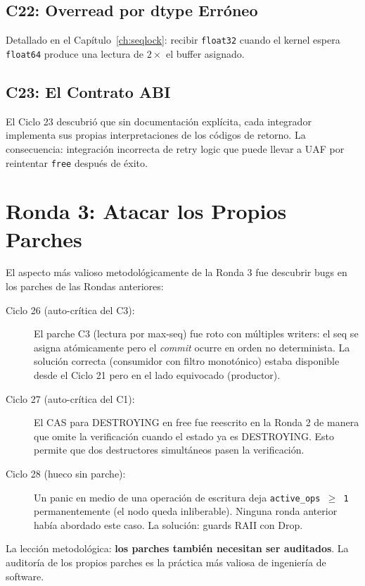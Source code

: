 \subsection{C22: Overread por dtype Erróneo}

Detallado en el Capítulo~\ref{ch:seqlock}: recibir \texttt{float32} cuando el
kernel espera \texttt{float64} produce una lectura de $2\times$ el buffer asignado.

\subsection{C23: El Contrato ABI}

El Ciclo 23 descubrió que sin documentación explícita, cada integrador implementa
sus propias interpretaciones de los códigos de retorno. La consecuencia: integración
incorrecta de retry logic que puede llevar a UAF por reintentar \texttt{free} después de éxito.

\section{Ronda 3: Atacar los Propios Parches}

El aspecto más valioso metodológicamente de la Ronda 3 fue descubrir bugs en los
parches de las Rondas anteriores:

\begin{description}
\item[Ciclo 26 (auto-crítica del C3):] El parche C3 (lectura por max-seq) fue roto
con múltiples writers: el seq se asigna atómicamente pero el \textit{commit} ocurre
en orden no determinista. La solución correcta (consumidor con filtro monotónico)
estaba disponible desde el Ciclo 21 pero en el lado equivocado (productor).

\item[Ciclo 27 (auto-crítica del C1):] El CAS para DESTROYING en free fue reescrito
en la Ronda 2 de manera que omite la verificación cuando el estado ya es DESTROYING.
Esto permite que dos destructores simultáneos pasen la verificación.

\item[Ciclo 28 (hueco sin parche):] Un panic en medio de una operación de escritura
deja \texttt{active\_ops $\ge$ 1} permanentemente (el nodo queda inliberable).
Ninguna ronda anterior había abordado este caso. La solución: guards RAII con Drop.
\end{description}

La lección metodológica: \textbf{los parches también necesitan ser auditados}.
La auditoría de los propios parches es la práctica más valiosa de ingeniería de software.

